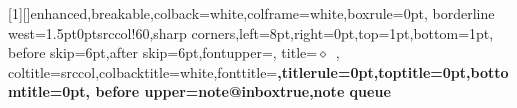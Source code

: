 \newcommand{\amt}[1]{\hspace{0.6em plus 1filll}#1}
\newcommand{\tacct}[4][2.6cm]{\begin{tabular}[t]{@{}p{#1}|p{#1}@{}}
  \multicolumn{2}{@{}c@{}}{\textbf{#2}}\\\hline
  \begin{tabular}[t]{@{}>{\raggedright\arraybackslash}p{#1}@{}}#3\end{tabular} &
  \begin{tabular}[t]{@{\,}>{\raggedright\arraybackslash}p{\dimexpr#1-0.2em}@{}}#4\end{tabular}
  \end{tabular}}
\makeatletter
\newenvironment{nfigure}{\par\medskip\begin{center}\def\@captype{figure}}{\end{center}\medskip}
\makeatother
\newenvironment{taccts}{\par\smallskip\begin{center}\renewcommand{\arraystretch}{1.15}}{\end{center}\smallskip}
[1][]{enhanced,breakable,colback=white,colframe=white,boxrule=0pt,
  borderline west={1.5pt}{0pt}{srccol!60},sharp corners,left=8pt,right=0pt,top=1pt,bottom=1pt,
  before skip=6pt,after skip=6pt,fontupper=\small,
  title={\footnotesize\sffamily$\diamond$\ },
  coltitle=srccol,colbacktitle=white,fonttitle=\bfseries,titlerule=0pt,toptitle=0pt,bottomtitle=0pt,
  before upper={\csname note@inboxtrue\endcsname},note queue}
